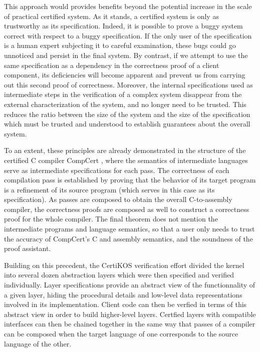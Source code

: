 \documentclass[format=sigplan,authordraft]{acmart}
\begin{document}
This approach would provides benefits
beyond the potential increase in the scale of
practical certified system.
As it stands,
a certified system is only
as trustworthy as its specification.
Indeed,
it is possible to prove a buggy system correct
with respect to a buggy specification.
If the only user of the specification
is a human expert subjecting it to careful examination,
these bugs could go unnoticed
and persist in the final system.
By contrast,
if we attempt to use the same specification as a dependency
in the correctness proof of a client component,
its deficiencies will become apparent
and prevent us from carrying out this second proof of correctness.
Moreover,
the internal specifications used
as intermediate steps
in the verification of a complex system
disappear from the external characterization of the system,
and no longer need to be trusted.
This reduces the ratio between the size of the system
and the size of the specification
which must be trusted and understood
to establish guarantees about the overall system.

To an extent,
these principles are already demonstrated in the structure of the
certified C compiler CompCert \cite{compcert},
where the semantics of intermediate languages
serve as intermediate specifications for each pass.
The correctness of each compilation pass is established by
proving that the behavior of its target program
is a refinement of its source program
(which serves in this case as its specification).
As passes are composed to obtain the overall
C-to-assembly compiler,
the correctness proofs are composed as well
to construct a correctness proof for the whole compiler.
The final theorem does not mention the intermediate
programs and language semantics,
so that a user only needs to trust
the accuracy of CompCert's C and assembly semantics,
and the soundness of the proof assistant.

Building on this precedent,
the CertiKOS verification effort \cite{popl15}
divided the kernel into several dozen abstraction layers
which were then specified and verified individually.
Layer specifications provide
an abstract view of the functionnality of a given layer,
hiding the procedural details and low-level data representations
involved in its implementation.
Client code can then be verfied in terms of
this abstract view
in order to build higher-level layers.
Certfied layers
with compatible interfaces can then be chained together
in the same way that passes of a compiler
can be composed when the target language of one
corresponds to the source language of the other.
\end{document}
